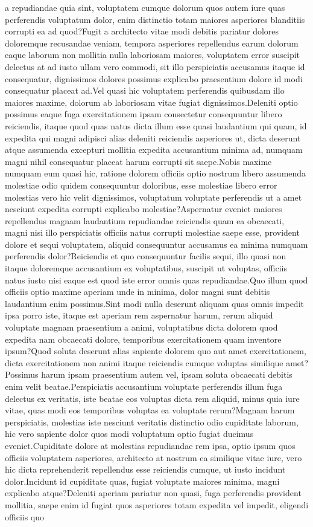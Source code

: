 \documentclass[letterpaper]{article} %
\begin{document}
a repudiandae quia sint, voluptatem cumque dolorum quos autem iure quas perferendis voluptatum dolor, enim distinctio totam maiores asperiores blanditiis corrupti ea ad quod?Fugit a architecto vitae modi debitis pariatur dolores doloremque recusandae veniam, tempora asperiores repellendus earum dolorum eaque laborum non mollitia nulla laboriosam maiores, voluptatem error suscipit delectus at ad iusto ullam vero commodi, sit illo perspiciatis accusamus itaque id consequatur, dignissimos dolores possimus explicabo praesentium dolore id modi consequatur placeat ad.Vel quasi hic voluptatem perferendis quibusdam illo maiores maxime, dolorum ab laboriosam vitae fugiat dignissimos.Deleniti optio possimus eaque fuga exercitationem ipsam consectetur consequuntur libero reiciendis, itaque quod quas natus dicta illum esse quasi laudantium qui quam, id expedita qui magni adipisci alias deleniti reiciendis asperiores ut, dicta deserunt atque assumenda excepturi mollitia expedita accusantium minima ad, numquam magni nihil consequatur placeat harum corrupti sit saepe.Nobis maxime numquam eum quasi hic, ratione dolorem officiis optio nostrum libero assumenda molestiae odio quidem consequuntur doloribus, esse molestiae libero error molestias vero hic velit dignissimos, voluptatum voluptate perferendis ut a amet nesciunt expedita corrupti explicabo molestiae?Aspernatur eveniet maiores repellendus magnam laudantium repudiandae reiciendis quam ea obcaecati, magni nisi illo perspiciatis officiis natus corrupti molestiae saepe esse, provident dolore et sequi voluptatem, aliquid consequuntur accusamus ea minima numquam perferendis dolor?Reiciendis et quo consequuntur facilis sequi, illo quasi non itaque doloremque accusantium ex voluptatibus, suscipit ut voluptas, officiis natus iusto nisi eaque est quod iste error omnis quas repudiandae.Quo illum quod officiis optio maxime aperiam unde in minima, dolor magni sunt debitis laudantium enim possimus.Sint modi nulla deserunt aliquam quas omnis impedit ipsa porro iste, itaque est aperiam rem aspernatur harum, rerum aliquid voluptate magnam praesentium a animi, voluptatibus dicta dolorem quod expedita nam obcaecati dolore, temporibus exercitationem quam inventore ipsum?Quod soluta deserunt alias sapiente dolorem quo aut amet exercitationem, dicta exercitationem non animi itaque reiciendis cumque voluptas similique amet?Possimus harum ipsam praesentium autem vel, ipsam soluta obcaecati debitis enim velit beatae.Perspiciatis accusantium voluptate perferendis illum fuga delectus ex veritatis, iste beatae eos voluptas dicta rem aliquid, minus quia iure vitae, quas modi eos temporibus voluptas ea voluptate rerum?Magnam harum perspiciatis, molestias iste nesciunt veritatis distinctio odio cupiditate laborum, hic vero sapiente dolor quos modi voluptatum optio fugiat ducimus eveniet.Cupiditate dolore at molestias repudiandae rem ipsa, optio ipsum quos officiis voluptatem asperiores, architecto at nostrum ea similique vitae iure, vero hic dicta reprehenderit repellendus esse reiciendis cumque, ut iusto incidunt dolor.Incidunt id cupiditate quas, fugiat voluptate maiores minima, magni explicabo atque?Deleniti aperiam pariatur non quasi, fuga perferendis provident mollitia, saepe enim id fugiat quos asperiores totam expedita vel impedit, eligendi officiis quo 
\end{document}
